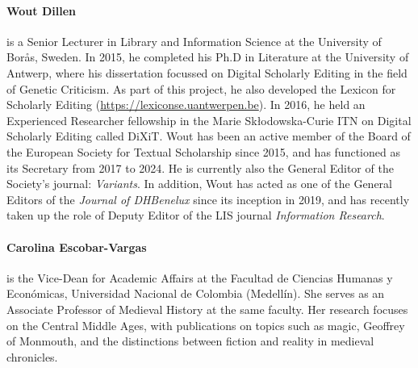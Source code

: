 \paragraph{Wout Dillen} is a Senior Lecturer in Library and Information Science at the University of Borås, Sweden. In 2015, he completed his Ph.D in Literature at the University of Antwerp, where his dissertation focussed on Digital Scholarly Editing in the field of Genetic Criticism. As part of this project, he also developed the Lexicon for Scholarly Editing (\url{https://lexiconse.uantwerpen.be}). In 2016, he held an Experienced Researcher fellowship in the Marie Skłodowska-Curie ITN on Digital Scholarly Editing called DiXiT. Wout has been an active member of the Board of the European Society for Textual Scholarship since 2015, and has functioned as its Secretary from 2017 to 2024. He is currently also the General Editor of the Society’s journal: \textit{Variants}. In addition, Wout has acted as one of the General Editors of the \textit{Journal of DHBenelux} since its inception in 2019, and has recently taken up the role of Deputy Editor of the LIS journal \textit{Information Research}.

\paragraph{Carolina Escobar-Vargas} is the Vice-Dean for Academic Affairs at the Facultad de Ciencias Humanas y Económicas, Universidad Nacional de Colombia (Medellín). She serves as an Associate Professor of Medieval History at the same faculty. Her research focuses on the Central Middle Ages, with publications on topics such as magic, Geoffrey of Monmouth, and the distinctions between fiction and reality in medieval chronicles.

